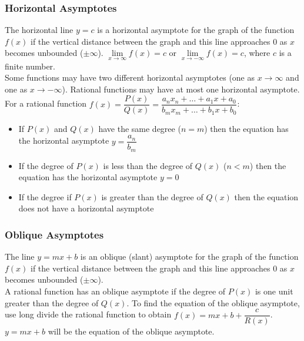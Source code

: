\documentclass{article}
\begin{document}
	\subsubsection{Horizontal Asymptotes}
	The horizontal line $y=c$ is a horizontal asymptote for the graph of the function $f(x)$ if the vertical distance between the graph and this line approaches 0 as $x$ becomes unbounded ($\pm\infty$). $\lim\limits_{x\to\infty}f(x)=c$ or $\lim\limits_{x\to-\infty}f(x)=c$, where $c$ is a finite number.\\
	Some functions may have two different horizontal asymptotes (one as $x\to\infty$ and one as $x\to-\infty$). Rational functions may have at most one horizontal asymptote.\\
	For a rational function $f(x)=\dfrac{P(x)}{Q(x)}=\dfrac{a_nx_n+\ldots+a_1x+a_0}{b_mx_m+\ldots+b_1x+b_0}$:
	\begin{itemize}
		\item If $P(x)$ and $Q(x)$ have the same degree ($n=m$) then the equation has the horizontal asymptote $y=\dfrac{a_n}{b_m}$
		\item If the degree of $P(x)$ is less than the degree of $Q(x)$ ($n<m$) then the equation has the horizontal asymptote $y=0$
		\item If the degree if $P(x)$ is greater than the degree of $Q(x)$ then the equation does not have a horizontal asymptote
	\end{itemize}
	\subsubsection{Oblique Asymptotes}
	The line $y=mx+b$ is an oblique (slant) asymptote for the graph of the function $f(x)$ if the vertical distance between the graph and this line approaches 0 as $x$ becomes unbounded ($\pm\infty$).\\
	A rational function has an oblique asymptote if the degree of $P(x)$ is one unit greater than the degree of $Q(x)$. To find the equation of the oblique asymptote, use long divide the rational function to obtain $f(x)=mx+b+\dfrac{c}{R(x)}$. $y=mx+b$ will be the equation of the oblique asymptote.
\end{document}
